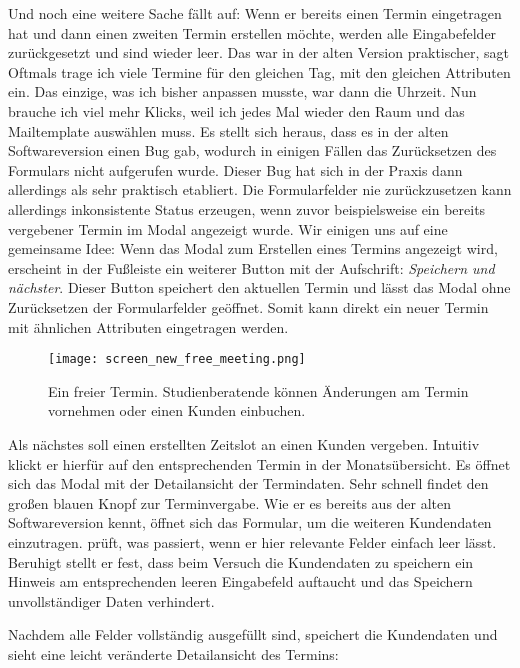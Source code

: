 Und noch eine weitere Sache fällt \ipName auf: Wenn er bereits einen Termin
eingetragen hat und dann einen zweiten Termin erstellen möchte, werden alle
Eingabefelder zurückgesetzt und sind wieder leer. \glqq{}Das war in der alten
Version praktischer\grqq{}, sagt \ipName \glqq{}Oftmals trage ich viele Termine
für den gleichen Tag, mit den gleichen Attributen ein. Das einzige, was ich
bisher anpassen musste, war dann die Uhrzeit. Nun brauche ich viel mehr Klicks,
weil ich jedes Mal wieder den Raum und das Mailtemplate auswählen
muss.\grqq{}\cite{clavesUsertest} Es stellt sich heraus, dass es in der alten
Softwareversion einen Bug gab, wodurch in einigen Fällen das Zurücksetzen des
Formulars nicht aufgerufen wurde. Dieser Bug hat sich in der Praxis dann
allerdings als sehr praktisch etabliert. Die Formularfelder nie zurückzusetzen
kann allerdings inkonsistente Status erzeugen, wenn zuvor beispielsweise ein
bereits vergebener Termin im Modal angezeigt wurde. Wir einigen uns auf eine
gemeinsame Idee: Wenn das Modal zum Erstellen eines Termins angezeigt wird,
erscheint in der Fußleiste ein weiterer Button mit der Aufschrift:
\textit{Speichern und nächster}. Dieser Button speichert den aktuellen Termin
und lässt das Modal ohne Zurücksetzen der Formularfelder geöffnet. Somit kann
direkt ein neuer Termin mit ähnlichen Attributen eingetragen werden.

\begin{figure}[H]
    \caption{Ein freier Termin. Studienberatende können Änderungen am Termin vornehmen oder einen Kunden einbuchen.}
    \centering
    \texttt{[image: screen\_new\_free\_meeting.png]}
\end{figure}

Als nächstes soll \ipName einen erstellten Zeitslot an einen Kunden vergeben.
Intuitiv klickt er hierfür auf den entsprechenden Termin in der
Monatsübersicht. Es öffnet sich das Modal mit der Detailansicht der
Termindaten. Sehr schnell findet \ipName den großen blauen Knopf zur
Terminvergabe. Wie er es bereits aus der alten Softwareversion kennt, öffnet
sich das Formular, um die weiteren Kundendaten einzutragen. \ipName prüft, was
passiert, wenn er hier relevante Felder einfach leer lässt. Beruhigt stellt er
fest, dass beim Versuch die Kundendaten zu speichern ein Hinweis am
entsprechenden leeren Eingabefeld auftaucht und das Speichern unvollständiger
Daten verhindert.

Nachdem alle Felder vollständig ausgefüllt sind, speichert \ipName die
Kundendaten und sieht eine leicht veränderte Detailansicht des Termins:

